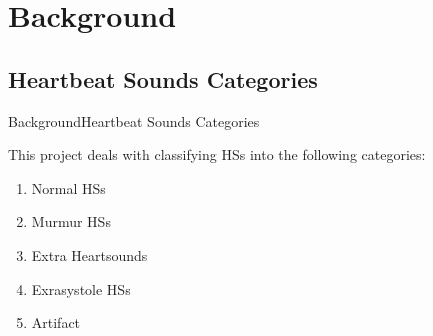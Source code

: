 \documentclass[10pt]{beamer}
\begin{document}

\section{Background}

\subsection{Heartbeat Sounds Categories}

\begin{frame}{Background}{Heartbeat Sounds Categories}


	
 This project deals with classifying HSs into the following categories:
  
  \begin{enumerate}
  	\item Normal HSs
  	\item Murmur HSs
  	\item Extra Heartsounds
  	\item Exrasystole HSs
  	\item Artifact
  \end{enumerate}


\end{frame}
\end{document}
